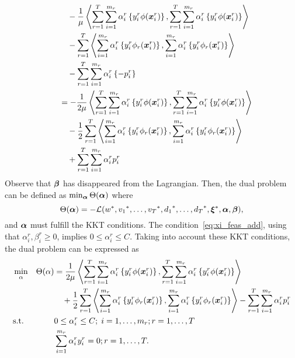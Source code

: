 \begin{equation}
\begin{aligned}
        &\qquad - \frac{1}{\mu} \left\langle  \sum_{r= 1}^T \sum_{i=1}^{m_r} {\alpha_i^r} \left\lbrace y_i^r \phi(\bm{x}_i^r) \right\rbrace,  \sum_{r= 1}^T \sum_{i=1}^{m_r} {\alpha_i^r} \left\lbrace y_i^r \phi(\bm{x}_i^r) \right\rbrace \right\rangle \\
        &\qquad -  \sum_{r= 1}^T {\left\langle \sum_{i=1}^{m_r} {\alpha_i^r} \left\lbrace y_i^r \phi_r(\bm{x}_i^r) \right\rbrace, \sum_{i=1}^{m_r} {\alpha_i^r} \left\lbrace y_i^r \phi_r(\bm{x}_i^r) \right\rbrace \right\rangle} \\
        &\qquad -  \sum_{r= 1}^T \sum_{i=1}^{m_r} \alpha_i^r \left\lbrace - p_{i}^r  \right\rbrace \\
        &\quad = - \frac{1}{2\mu} \left\langle  \sum_{r= 1}^T \sum_{i=1}^{m_r} {\alpha_i^r} \left\lbrace y_i^r \phi(\bm{x}_i^r) \right\rbrace,  \sum_{r= 1}^T \sum_{i=1}^{m_r} {\alpha_i^r} \left\lbrace y_i^r \phi(\bm{x}_i^r) \right\rbrace \right\rangle \\
        &\qquad - \frac{1}{2} \sum_{r= 1}^T {\left\langle \sum_{i=1}^{m_r} {\alpha_i^r} \left\lbrace y_i^r \phi_r(\bm{x}_i^r) \right\rbrace, \sum_{i=1}^{m_r} {\alpha_i^r} \left\lbrace y_i^r \phi_r(\bm{x}_i^r) \right\rbrace \right\rangle} \\
        &\qquad +  \sum_{r= 1}^T \sum_{i=1}^{m_r} \alpha_i^r  p_{i}^r 
    \end{aligned}
\end{equation}
Observe that $\bm{\beta}$ has disappeared from the Lagrangian.
Then, the dual problem can be defined as $\min_{\bm{\alpha}} \Theta(\bm{\alpha})$ where 
$$ \Theta(\bm{\alpha}) = - \mathcal{L}({{w}}^*, {{v}_1}^*, \ldots, {{v}_T}^*, {d_1}^*, \ldots, {d_T}^*, {\bm{\xi}}^*, \bm{\alpha}, \bm{\beta}), $$
and $\bm{\alpha}$ must fulfill the KKT conditions. The condition~\eqref{eq:xi_feas_add}, using that $\alpha_i^r , \beta_i^r \geq 0$, implies $0 \leq \alpha_i^r \leq C$. Taking into account these KKT conditions, the dual problem can be expressed as
\begin{equation}\label{eq:svmmtl_dual_add}
    \begin{aligned}
    & \min_{\alpha} & \Theta(\alpha) &=  \frac{1}{2\mu} \dotp{ \sum_{r= 1}^T \sum_{i=1}^{m_r} {\alpha_i^r} \left\lbrace y_i^r \phi(\fv{x}_i^r) \right\rbrace}{ \sum_{r= 1}^T \sum_{i=1}^{m_r} {\alpha_i^r} \left\lbrace y_i^r \phi(\fv{x}_i^r) \right\rbrace} \\
    & & &\quad + \frac{1}{2} \sum_{r= 1}^T {\dotp{\sum_{i=1}^{m_r} {\alpha_i^r} \left\lbrace y_i^r \phi_r(\fv{x}_i^r) \right\rbrace}{\sum_{i=1}^{m_r} {\alpha_i^r} \left\lbrace y_i^r \phi_r(\fv{x}_i^r) \right\rbrace}}  - \sum_{r=1}^\ntasks \sum_{i=1}^{\npertask_r} \alpha_i^r p_i^r \\
    & \text{s.t.}
    & & 0 \leq \alpha_i^r \leq C ; \; i=1, \ldots, m_r; r=1, \ldots, \ntasks \\
    & & & \sum_{i=1}^{m_r} \alpha_i^r y_i^r = 0;  r=1, \ldots, \ntasks . \\
    \end{aligned}
\end{equation}
